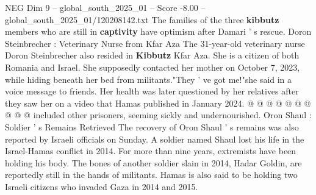 \begin{textsample}{NEG Dim 9 – global\_south\_2025\_01 – Score -8.00 – global\_south\_2025\_01/120208142.txt}
The families of the three \textbf{kibbutz} members who are still in \textbf{captivity} have optimism after Damari ' s rescue.
Doron Steinbrecher : Veterinary Nurse from Kfar Aza The 31-year-old veterinary nurse Doron Steinbrecher also resided in \textbf{Kibbutz} Kfar Aza.
She is a citizen of both Romania and Israel.
She supposedly contacted her mother on October 7, 2023, while hiding beneath her bed from militants."They ' ve got me!"she said in a voice message to friends.
Her health was later questioned by her relatives after they saw her on a video that Hamas published in January 2024. @ @ @ @ @ @ @ @ @ @ included other prisoners, seeming sickly and undernourished.
Oron Shaul : Soldier ' s Remains Retrieved The recovery of Oron Shaul ' s remains was also reported by Israeli officials on Sunday.
A soldier named Shaul lost his life in the Israel-Hamas conflict in 2014.
For more than nine years, extremists have been holding his body.
The bones of another soldier slain in 2014, Hadar Goldin, are reportedly still in the hands of militants.
Hamas is also said to be holding two Israeli citizens who invaded Gaza in 2014 and 2015.

\end{textsample}
